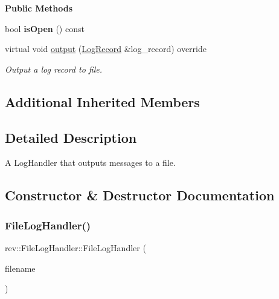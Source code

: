 \begin{Indent}\textbf{ Public Methods}\par
\begin{DoxyCompactItemize}
\item 
\mbox{\label{classrev_1_1_file_log_handler_a72c47a3c1a5ec720f47e5d48fa7ee697}} 
bool {\bfseries is\+Open} () const
\item 
virtual void \mbox{\hyperlink{classrev_1_1_file_log_handler_ae562434aed64d166aaa1d8660984a3be}{output}} (\mbox{\hyperlink{classrev_1_1_log_record}{Log\+Record}} \&log\+\_\+record) override
\begin{DoxyCompactList}\small\item\em Output a log record to file. \end{DoxyCompactList}\end{DoxyCompactItemize}
\end{Indent}
\subsection*{Additional Inherited Members}


\subsection{Detailed Description}
A Log\+Handler that outputs messages to a file. 

\subsection{Constructor \& Destructor Documentation}
\mbox{\label{classrev_1_1_file_log_handler_a032982146b91183085989aab43889a80}} 
\subsubsection{\texorpdfstring{FileLogHandler()}{FileLogHandler()}\hspace{0.1cm}{\footnotesize\ttfamily [1/2]}}
{\footnotesize\ttfamily rev\+::\+File\+Log\+Handler\+::\+File\+Log\+Handler (\begin{DoxyParamCaption}\item[{const \mbox{\hyperlink{classrev_1_1_g_string}{G\+String}} \&}]{filename }\end{DoxyParamCaption})}



